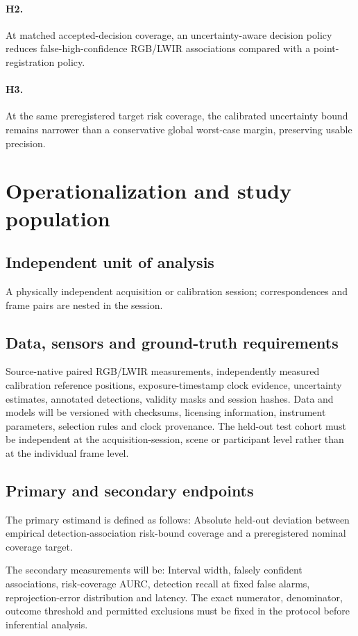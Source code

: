 \documentclass[11pt,a4paper]{article}
\begin{document}
\paragraph{H2.} At matched accepted-decision coverage, an uncertainty-aware decision policy reduces false-high-confidence RGB/LWIR associations compared with a point-registration policy.

\paragraph{H3.} At the same preregistered target risk coverage, the calibrated uncertainty bound remains narrower than a conservative global worst-case margin, preserving usable precision.

\section{Operationalization and study population}
\subsection{Independent unit of analysis}
A physically independent acquisition or calibration session; correspondences and frame pairs are nested in the session.

\subsection{Data, sensors and ground-truth requirements}
Source-native paired RGB/LWIR measurements, independently measured calibration reference positions, exposure-timestamp clock evidence, uncertainty estimates, annotated detections, validity masks and session hashes. Data and models will be versioned with checksums, licensing information, instrument parameters, selection rules and clock provenance. The held-out test cohort must be independent at the acquisition-session, scene or participant level rather than at the individual frame level.

\subsection{Primary and secondary endpoints}
The primary estimand is defined as follows: Absolute held-out deviation between empirical detection-association risk-bound coverage and a preregistered nominal coverage target.

The secondary measurements will be: Interval width, falsely confident associations, risk-coverage AURC, detection recall at fixed false alarms, reprojection-error distribution and latency. The exact numerator, denominator, outcome threshold and permitted exclusions must be fixed in the protocol before inferential analysis.
\end{document}
